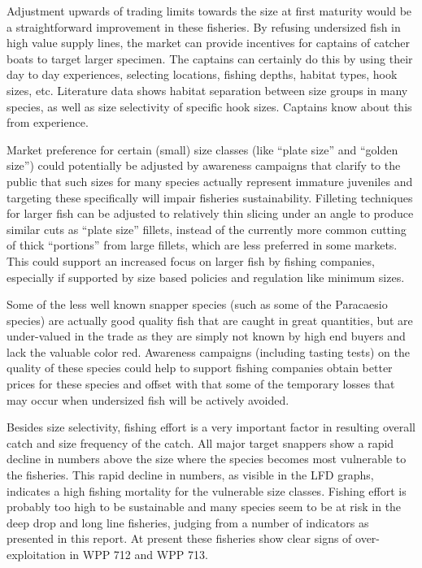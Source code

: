 Adjustment upwards of trading limits towards the size at first maturity would be a straightforward improvement in these fisheries. By refusing undersized fish in high value supply lines, the market can provide incentives for captains of catcher boats to target larger specimen. The captains can certainly do this by using their day to day experiences, selecting locations, fishing depths, habitat types, hook sizes, etc. Literature data shows habitat separation between size groups in many species, as well as size selectivity of specific hook sizes. Captains know about this from experience.

Market preference for certain (small) size classes (like ``plate size'' and ``golden size'') could potentially be adjusted by awareness campaigns that clarify to the public that such sizes for many species actually represent immature juveniles and targeting these specifically will impair fisheries sustainability. Filleting techniques for larger fish can be adjusted to relatively thin slicing under an angle to produce similar cuts as ``plate size'' fillets, instead of the currently more common cutting of thick ``portions'' from large fillets, which are less preferred in some markets. This could support an increased focus on larger fish by fishing companies, especially if supported by size based policies and regulation like minimum sizes.

Some of the less well known snapper species (such as some of the Paracaesio species) are actually good quality fish that are caught in great quantities, but are under-valued in the trade as they are simply not known by high end buyers and lack the valuable color red. Awareness campaigns (including tasting tests) on the quality of these species could help to support fishing companies obtain better prices for these species and offset with that some of the temporary losses that may occur when undersized fish will be actively avoided.

Besides size selectivity, fishing effort is a very important factor in resulting overall catch and size frequency of the catch. All major target snappers show a rapid decline in numbers above the size where the species becomes most vulnerable to the fisheries. This rapid decline in numbers, as visible in the LFD graphs, indicates a high fishing mortality for the vulnerable size classes. Fishing effort is probably too high to be sustainable and many species seem to be at risk in the deep drop and long line fisheries, judging from a number of indicators as presented in this report. At present these fisheries show clear signs of over-exploitation in WPP 712 and WPP 713.

